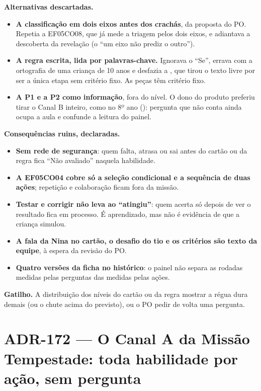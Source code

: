 \textbf{Alternativas descartadas.}

\begin{itemize}
  \item \textbf{A classificação em dois eixos antes dos crachás}, da proposta
    do PO. Repetia a EF05CO08, que já mede a triagem pelos dois eixos, e
    adiantava a descoberta da revelação (o \enquote{um eixo não prediz o
    outro}).
  \item \textbf{A regra escrita, lida por palavras-chave.} Ignorava o
    \enquote{Se}, errava com a ortografia de uma criança de 10 anos e desfazia
    a , que tirou o texto livre por ser a única etapa sem
    critério fixo. As peças têm critério fixo.
  \item \textbf{A P1 e a P2 como informação}, fora do nível. O dono do produto
    preferiu tirar o Canal B inteiro, como no 8º ano (): pergunta
    que não conta ainda ocupa a aula e confunde a leitura do painel.
\end{itemize}

\textbf{Consequências ruins, declaradas.}

\begin{itemize}
  \item \textbf{Sem rede de segurança}: quem falta, atrasa ou sai antes do
    cartão ou da regra fica \enquote{Não avaliado} naquela habilidade.
  \item \textbf{A EF05CO04 cobre só a seleção condicional e a sequência de
    duas ações}; repetição e colaboração ficam fora da missão.
  \item \textbf{Testar e corrigir não leva ao \enquote{atingiu}}: quem acerta
    só depois de ver o resultado fica em processo. É aprendizado, mas não é
    evidência de que a criança simulou.
  \item \textbf{A fala da Nina no cartão, o desafio do tio e os critérios são
    texto da equipe}, à espera da revisão do PO.
  \item \textbf{Quatro versões da ficha no histórico}: o painel não separa as
    rodadas medidas pelas perguntas das medidas pelas ações.
\end{itemize}

\textbf{Gatilho.} A distribuição dos níveis do cartão ou da regra mostrar a
régua dura demais (ou o chute acima do previsto), ou o PO pedir de volta uma
pergunta.

\section{ADR-172 --- O Canal A da Missão Tempestade: toda habilidade por ação, sem pergunta}
\label{adr:exp02em1b-canal-a}

